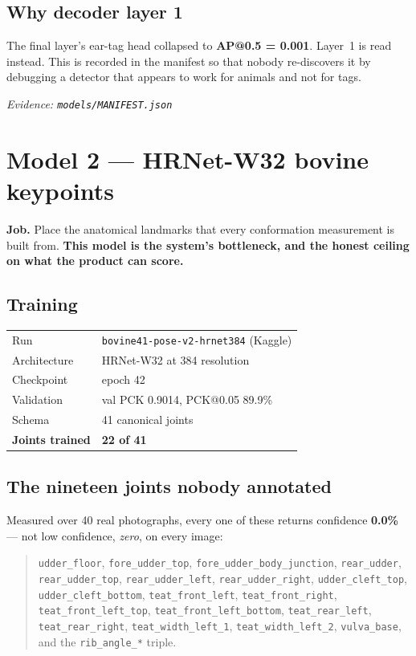 \documentclass[11pt,a4paper]{article}
\newcommand{\evidence}[1]{{\small\color{soft}\textit{Evidence: #1}}}
\newcommand{\bad}[1]{{\color{invented}\textbf{#1}}}
\begin{document}
\subsection*{Why decoder layer 1}

The final layer's ear-tag head collapsed to \bad{AP@0.5 = 0.001}. Layer~1 is
read instead. This is recorded in the manifest so that nobody re-discovers it
by debugging a detector that appears to work for animals and not for tags.

\evidence{\texttt{models/MANIFEST.json}}

\section{Model 2 --- HRNet-W32 bovine keypoints}

\textbf{Job.} Place the anatomical landmarks that every conformation
measurement is built from. \textbf{This model is the system's bottleneck, and
the honest ceiling on what the product can score.}

\subsection*{Training}

\begin{tabular}{@{}ll@{}}
\toprule
Run & \texttt{bovine41-pose-v2-hrnet384} (Kaggle) \\
Architecture & HRNet-W32 at 384 resolution \\
Checkpoint & epoch 42 \\
Validation & val PCK 0.9014, PCK@0.05 89.9\% \\
Schema & 41 canonical joints \\
\bad{Joints trained} & \bad{22 of 41} \\
\bottomrule
\end{tabular}

\subsection*{The nineteen joints nobody annotated}

Measured over 40 real photographs, every one of these returns confidence
\bad{0.0\%} --- not low confidence, \emph{zero}, on every image:

\begin{quote}\small
\texttt{udder\_floor}, \texttt{fore\_udder\_top},
\texttt{fore\_udder\_body\_junction}, \texttt{rear\_udder},
\texttt{rear\_udder\_top}, \texttt{rear\_udder\_left},
\texttt{rear\_udder\_right}, \texttt{udder\_cleft\_top},
\texttt{udder\_cleft\_bottom}, \texttt{teat\_front\_left},
\texttt{teat\_front\_right}, \texttt{teat\_front\_left\_top},
\texttt{teat\_front\_left\_bottom}, \texttt{teat\_rear\_left},
\texttt{teat\_rear\_right}, \texttt{teat\_width\_left\_1},
\texttt{teat\_width\_left\_2}, \texttt{vulva\_base}, and the
\texttt{rib\_angle\_*} triple.
\end{quote}
\end{document}
